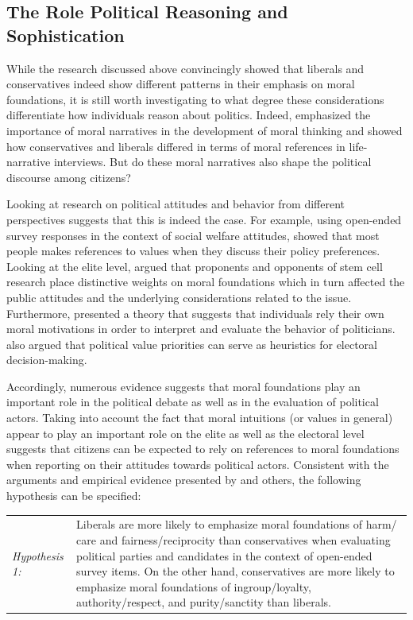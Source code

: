 \documentclass[12pt]{paper}
\begin{document}
\subsection{The Role Political Reasoning and Sophistication}

While the research discussed above convincingly showed that liberals and conservatives indeed show different patterns in their emphasis on moral foundations, it is still worth investigating to what degree these considerations differentiate how individuals reason about politics. Indeed, \citet{haidt2008moral} emphasized the importance of moral narratives in the development of moral thinking and \citet{mcadams2008family} showed how conservatives and liberals differed in terms of moral references in life-narrative interviews. But do these moral narratives also shape the political discourse among citizens?

Looking at research on political attitudes and behavior from different perspectives suggests that this is indeed the case. For example, using open-ended survey responses in the context of social welfare attitudes, \citet{feldman1992political} showed that most people makes references to values when they discuss their policy preferences. Looking at the elite level, \citet{clifford2013words} argued that proponents and opponents of stem cell research place distinctive weights on moral foundations which in turn affected the public attitudes and the underlying considerations related to the issue. Furthermore, \citet{clifford2014linking} presented a theory that suggests that individuals rely their own moral motivations in order to interpret and evaluate the behavior of politicians. \citet{marietta2007values} also argued that political value priorities can serve as heuristics for electoral decision-making.

Accordingly, numerous evidence suggests that moral foundations play an important role in the political debate as well as in the evaluation of political actors. Taking into account the fact that moral intuitions (or values in general) appear to play an important role on the elite as well as the electoral level suggests that citizens can be expected to rely on references to moral foundations when reporting on their attitudes towards political actors. Consistent with the arguments and empirical evidence presented by \citet{graham2009liberals} and others, the following hypothesis can be specified:

\vspace{0.3cm}
\begin{tabular}{lp{12cm}}
\textsl{Hypothesis 1:} & Liberals are more likely to emphasize moral foundations of harm/ care and fairness/reciprocity  than conservatives when evaluating political parties and candidates in the context of open-ended survey items. On the other hand, conservatives are more likely to emphasize moral foundations of ingroup/loyalty, authority/respect, and purity/sanctity than liberals.
\end{tabular}
\vspace{0.5cm}
\end{document}
